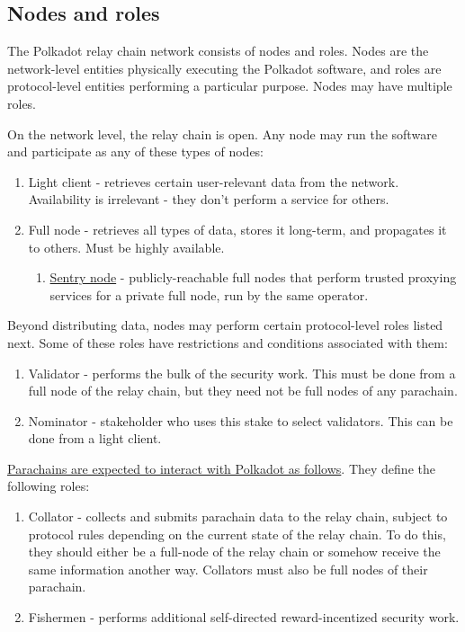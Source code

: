 \subsection{Nodes and roles}

The Polkadot relay chain network consists of nodes and roles. Nodes are the network-level entities physically executing the Polkadot software, and roles are protocol-level entities performing a particular purpose. Nodes may have multiple roles.

On the network level, the relay chain is open. Any node may run the software and participate as any of these types of nodes:

\begin{enumerate}
\item Light client - retrieves certain user-relevant data from the network. Availability is irrelevant - they don't perform a service for others.
\item Full node - retrieves all types of data, stores it long-term, and propagates it to others. Must be highly available.
  \begin{enumerate}
  \item \hyperref[sec:net_sentry]{Sentry node} - publicly-reachable full nodes that perform trusted proxying services for a private full node, run by the same operator.
  \end{enumerate}
\end{enumerate}

Beyond distributing data, nodes may perform certain protocol-level roles listed next. Some of these roles have restrictions and conditions associated with them:

\begin{enumerate}
\item Validator - performs the bulk of the security work. This must be done from a full node of the relay chain, but they need not be full nodes of any parachain.
\item Nominator - stakeholder who uses this stake to select validators. This can be done from a light client.
\end{enumerate}

\uline{Parachains are expected to interact with Polkadot as follows}. They define the following roles:

\begin{enumerate}
\item Collator - collects and submits parachain data to the relay chain, subject to protocol rules depending on the current state of the relay chain. To do this, they should either be a full-node of the relay chain or somehow receive the same information another way. Collators must also be full nodes of their parachain.
\item Fishermen - performs additional self-directed reward-incentized security work.
\end{enumerate}

